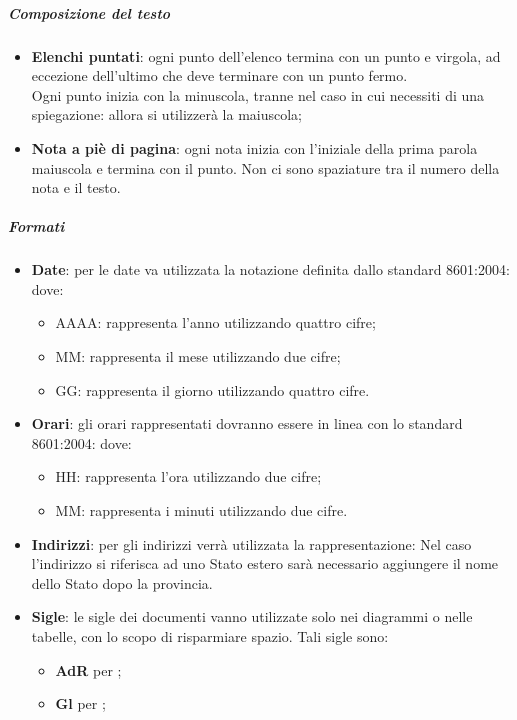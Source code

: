 	\subparagraph{Composizione del testo}
		\begin{itemize}
			\item \textbf{Elenchi puntati}: ogni punto dell'elenco termina con un punto e virgola, ad eccezione dell'ultimo che deve terminare con un punto fermo. \\
			Ogni punto inizia con la minuscola, tranne nel caso in cui necessiti di una spiegazione: allora si utilizzerà la maiuscola;
			\item \textbf{Nota a piè di pagina}: ogni nota inizia con l'iniziale della prima parola maiuscola e termina con il punto. Non ci sono spaziature tra il numero della nota e il testo.
		\end{itemize}
	\subparagraph{Formati}
		\begin{itemize}
			\item \textbf{Date}: per le date va utilizzata la notazione definita dallo standard  8601:2004:
			dove:
			\begin{itemize}
				\item AAAA: rappresenta l'anno utilizzando quattro cifre;
				\item MM: rappresenta il mese utilizzando due cifre;
				\item GG: rappresenta il giorno utilizzando quattro cifre.
			\end{itemize}
			\item \textbf{Orari}: gli orari rappresentati dovranno essere in linea con lo standard  8601:2004:
			dove:
			\begin{itemize}
				\item HH: rappresenta l'ora utilizzando due cifre;
				\item MM: rappresenta i minuti utilizzando due cifre.
			\end{itemize}
			\item \textbf{Indirizzi}: per gli indirizzi verrà utilizzata la rappresentazione:
			Nel caso l'indirizzo si riferisca ad uno Stato estero sarà necessario aggiungere il nome dello Stato dopo la provincia.	
			\item \textbf{Sigle}: le sigle dei documenti vanno utilizzate solo nei diagrammi o nelle tabelle, con lo scopo di risparmiare spazio. Tali sigle sono:
			\begin{itemize}
				\item \textbf{AdR} per \ARdoc;
				\item \textbf{Gl} per \Gldoc;

\end{itemize}
\end{itemize}
